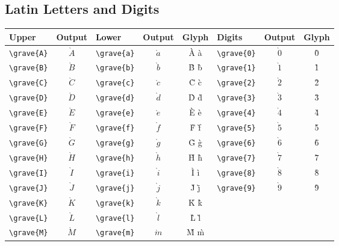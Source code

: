 \documentclass[12pt,a4paper]{article}
\begin{document}
\subsection*{Latin Letters and Digits}
\begin{longtable}{|l|c|l|c|c|l|c|c|}
\hline
\textbf{Upper}   & \textbf{Output} & \textbf{Lower}   & \textbf{Output} & \textbf{Glyph} & \textbf{Digits}  & \textbf{Output} & \textbf{Glyph} \\
\hline
\verb|\grave{A}| & $\grave{A}$     & \verb|\grave{a}| & $\grave{a}$     & À à            & \verb|\grave{0}| & $\grave{0}$     & 0̀ \\
\verb|\grave{B}| & $\grave{B}$     & \verb|\grave{b}| & $\grave{b}$     & B̀ b̀            & \verb|\grave{1}| & $\grave{1}$     & 1̀ \\
\verb|\grave{C}| & $\grave{C}$     & \verb|\grave{c}| & $\grave{c}$     & C̀ c̀            & \verb|\grave{2}| & $\grave{2}$     & 2̀ \\
\verb|\grave{D}| & $\grave{D}$     & \verb|\grave{d}| & $\grave{d}$     & D̀ d̀            & \verb|\grave{3}| & $\grave{3}$     & 3̀ \\
\verb|\grave{E}| & $\grave{E}$     & \verb|\grave{e}| & $\grave{e}$     & È è            & \verb|\grave{4}| & $\grave{4}$     & 4̀ \\
\verb|\grave{F}| & $\grave{F}$     & \verb|\grave{f}| & $\grave{f}$     & F̀ f̀            & \verb|\grave{5}| & $\grave{5}$     & 5̀ \\
\verb|\grave{G}| & $\grave{G}$     & \verb|\grave{g}| & $\grave{g}$     & G̀ g̀            & \verb|\grave{6}| & $\grave{6}$     & 6̀ \\
\verb|\grave{H}| & $\grave{H}$     & \verb|\grave{h}| & $\grave{h}$     & H̀ h̀            & \verb|\grave{7}| & $\grave{7}$     & 7̀ \\
\verb|\grave{I}| & $\grave{I}$     & \verb|\grave{i}| & $\grave{i}$     & Ì ì            & \verb|\grave{8}| & $\grave{8}$     & 8̀ \\
\verb|\grave{J}| & $\grave{J}$     & \verb|\grave{j}| & $\grave{j}$     & J̀ j̀            & \verb|\grave{9}| & $\grave{9}$     & 9̀ \\
\verb|\grave{K}| & $\grave{K}$     & \verb|\grave{k}| & $\grave{k}$     & K̀ k̀            &                  &                 & \\
\verb|\grave{L}| & $\grave{L}$     & \verb|\grave{l}| & $\grave{l}$     & L̀ l̀            &                  &                 & \\
\verb|\grave{M}| & $\grave{M}$     & \verb|\grave{m}| & $\grave{m}$     & M̀ m̀            &                  &                 & \\

\end{longtable}
\end{document}
